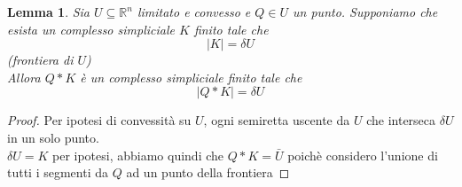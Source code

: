 \documentclass[a4paper]{report}
\newtheorem{lemma}{Lemma}
\newcommand{\R}{\ensuremath{\mathbb{R}}}
\begin{document}
\begin{center}

\end{center}
\begin{lemma}
    Sia $U\subseteq\R^n$ limitato e convesso e $Q\in U$ un punto. Supponiamo che esista un complesso simpliciale $K$ finito tale che
    \[
        |K|=\delta U
    \]
    (frontiera di $U$)\\
    Allora $Q*K$ è un complesso simpliciale finito tale che
    \[
        |Q*K|=\delta U
    \]
\end{lemma}
\begin{proof}
    Per ipotesi di convessità su $U$, ogni semiretta uscente da $U$ che interseca $\delta U$ in un solo punto.\\
    $\delta U=K$ per ipotesi, abbiamo quindi che $Q*K=\bar{U}$ poichè considero l'unione di tutti i segmenti da $Q$ ad un punto della frontiera
\end{proof}
\end{document}
